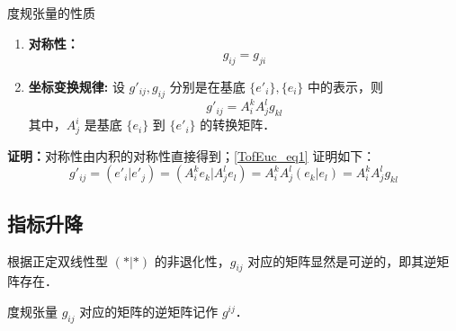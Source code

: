 \begin{theorem}{度规张量的性质}
\begin{enumerate}
\item \textbf{对称性：}\begin{equation}
g_{ij}=g_{ji}
\end{equation}
\item \textbf{坐标变换规律:} 设 $g'_{ij},g_{ij}$ 分别是在基底 $\{e'_i\},\{e_i\}$ 中的表示，则
\begin{equation}\label{TofEuc_eq1}
g'_{ij}=A^k_{i} A^l_{j}g_{kl}
\end{equation}
其中，$A^i_j$ 是基底 $\{e_i\}$ 到 $\{e'_i\}$ 的转换矩阵．
\end{enumerate}
\end{theorem}
\textbf{证明：}对称性由内积的对称性直接得到；\autoref{TofEuc_eq1} 证明如下：
\begin{equation}
g'_{ij}=(e'_i|e'_j)=(A^k_i e_k|A^l_j e_l)=A^k_{i} A^l_{j}(e_k|e_l)=A^k_{i} A^l_{j}g_{kl}
\end{equation}

\subsection{指标升降}
根据正定双线性型 $(*|*)$ 的非退化性，$g_{ij}$ 对应的矩阵显然是可逆的，即其逆矩阵存在．
\begin{definition}{}
度规张量 $g_{ij}$ 对应的矩阵的逆矩阵记作 $g^{ij}$．
\end{definition}
